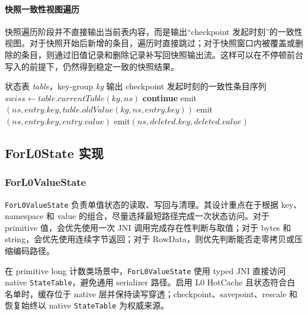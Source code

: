 \documentclass[a4paper,11pt]{article}
\begin{document}
\paragraph{快照一致性视图遍历}

快照遍历阶段并不直接输出当前表内容，而是输出“checkpoint 发起时刻”的一致性视图。对于快照开始后新增的条目，遍历时直接跳过；对于快照窗口内被覆盖或删除的条目，则通过旧值记录和删除记录补写回快照输出流。这样可以在不停顿前台写入的前提下，仍然得到稳定一致的快照结果。

\begin{algorithm}[!htbp]
\caption{快照一致性视图遍历算法}
\footnotesize
\begin{algorithmic}[1]
\Require 状态表 \textit{table}，key-group \textit{kg}
\Ensure 输出 checkpoint 发起时刻的一致性条目序列
  \State $swiss \gets table.currentTable(kg, ns)$
      \State \textbf{continue}
      \State emit$(ns, entry.key, table.oldValue(kg, ns, entry.key))$
    \Else
      \State emit$(ns, entry.key, entry.value)$
    \EndIf
  \EndFor
    \State emit$(ns, deleted.key, deleted.value)$
  \EndFor
\EndFor
\end{algorithmic}
\end{algorithm}

\subsection{ForL0State 实现}

\subsubsection{ForL0ValueState}

\texttt{ForL0ValueState} 负责单值状态的读取、写回与清理。其设计重点在于根据 key、namespace 和 value 的组合，尽量选择最短路径完成一次状态访问。对于 primitive 值，会优先使用一次 JNI 调用完成存在性判断与取值；对于 bytes 和 string，会优先使用连续字节返回；对于 RowData，则优先判断能否走零拷贝或压缩编码路径。

在 primitive long 计数类场景中，\texttt{ForL0ValueState} 使用 typed JNI 直接访问 native \texttt{StateTable}，避免通用 serializer 路径。启用 L0 HotCache 且状态符合白名单时，缓存位于 native 层并保持读写穿透；checkpoint、savepoint、rescale 和恢复始终以 native \texttt{StateTable} 为权威来源。
\end{document}
